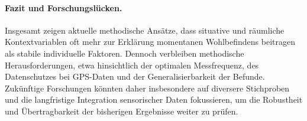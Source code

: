 \paragraph{Fazit und Forschungslücken.}
Insgesamt zeigen aktuelle methodische Ansätze, dass situative und räumliche Kontextvariablen oft mehr zur Erklärung momentanen Wohlbefindens beitragen als stabile individuelle Faktoren. Dennoch verbleiben methodische Herausforderungen, etwa hinsichtlich der optimalen Messfrequenz, des Datenschutzes bei GPS-Daten und der Generalisierbarkeit der Befunde. Zukünftige Forschungen könnten daher insbesondere auf diversere Stichproben und die langfristige Integration sensorischer Daten fokussieren, um die Robustheit und Übertragbarkeit der bisherigen Ergebnisse weiter zu prüfen.
